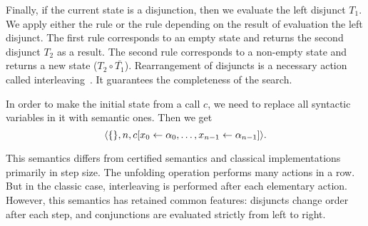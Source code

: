 Finally, if the current state is a disjunction, then we evaluate the left disjunct $T_1$. We apply either the  rule or the  rule depending on the result of evaluation the left disjunct. The first rule corresponds to an empty state and returns the second disjunct $T_2$ as a result. The second rule corresponds to a non-empty state and returns a new state ($T_2 \circ \bar{T_1}$). Rearrangement of disjuncts is a necessary action called interleaving~\cite{fair:interleaving}. It guarantees the completeness of the search.

In order to make the initial state from a call $c$, we need to replace all syntactic variables in it with semantic ones. Then we get
\[
\langle \{\}, n, c[x_0 \leftarrow \alpha_0, \ldots, x_{n-1} \leftarrow \alpha_{n-1}] \rangle.
\]

This semantics differs from certified semantics and classical implementations primarily in step size. The unfolding operation performs many actions in a row. But in the classic case, interleaving is performed after each elementary action. However, this semantics has retained common features: disjuncts change order after each step, and conjunctions are evaluated strictly from left to right. 


\begin{comment}
\[
\begin{array}{l}
\inbr{\{\}, 1, \mbox{\lstinline{revers}}^o \, [1] \; \alpha_0 : \epsilon} 
\xrightarrow{\circ} \\
\inbr{\{\alpha_1 = 1; \alpha_2 = []\}, 4, \mbox{\lstinline{revers}}^o \, \alpha_2 \; \alpha_3 : \mbox{\lstinline{append}}^o \, \alpha_3 \; [\alpha_1] \; \alpha_0 : \epsilon}
\xrightarrow{\circ} \\
\inbr{\{\alpha_1 = 1; \alpha_2 = []; \alpha_3 = []\}, 4, \mbox{\lstinline{append}}^o \, \alpha_3 \; [\alpha_1] \; \alpha_0 : \epsilon} 
\xrightarrow{\circ} \\
\inbr{\{\alpha_1 = 1; \alpha_2 = []; \alpha_3 = []\; \alpha_0 = [\alpha_1]\}, \epsilon}
\xrightarrow{\{\alpha_1 = 1; \alpha_2 = []; \alpha_3 = []\; \alpha_0 = [\alpha_1]\}} \emptyset
\end{array}
\]
\end{comment}

